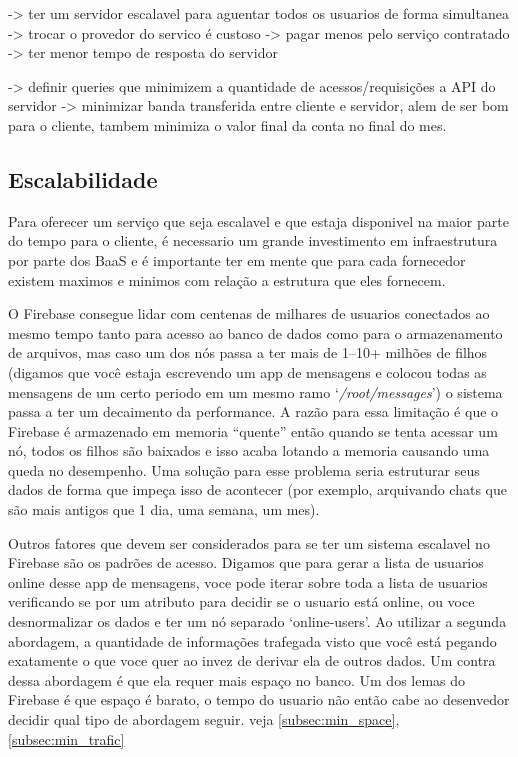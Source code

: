 	-> ter um servidor escalavel para aguentar todos os usuarios de forma simultanea
	-> trocar o provedor do servico é custoso
	-> pagar menos pelo serviço contratado
 	-> ter menor tempo de resposta do servidor

	-> definir queries que minimizem a quantidade de acessos/requisições a API do servidor
	-> minimizar banda transferida entre cliente e servidor, alem de ser bom para o cliente, tambem minimiza o valor final da conta no final do mes.


	\subsection{Escalabilidade}%
	\label{subsec:scalability}
	Para oferecer um serviço que seja escalavel e que estaja disponivel na maior parte do tempo para o cliente, é necessario um grande investimento em infraestrutura por parte dos BaaS e é importante ter em mente que para cada fornecedor existem maximos e minimos com relação a estrutura que eles fornecem. 

	O Firebase consegue lidar com centenas de milhares de usuarios conectados ao mesmo tempo tanto para acesso ao banco de dados como para o armazenamento de arquivos, mas caso um dos nós passa a ter mais de 1--10+ milhões de filhos (digamos que você estaja escrevendo um app de mensagens e colocou todas as mensagens de um certo periodo em um mesmo ramo `\textit{/root/messages}') o sistema passa a ter um decaimento da performance. A razão para essa limitação é que o Firebase é armazenado em memoria ``quente'' então quando se tenta acessar um nó, todos os filhos são baixados e isso acaba lotando a memoria causando uma queda no desempenho. Uma solução para esse problema seria estruturar seus dados de forma que impeça isso de acontecer (por exemplo, arquivando chats que são mais antigos que 1 dia, uma semana, um mes). 	

	Outros fatores que devem ser considerados para se ter um sistema escalavel no Firebase são os padrões de acesso. Digamos que para gerar a lista de usuarios online desse app de mensagens, voce pode iterar sobre toda a lista de usuarios verificando se por um atributo para decidir se o usuario está online, ou voce desnormalizar os dados e ter um nó separado `online-users'. Ao utilizar a segunda abordagem, a quantidade de informações trafegada visto que você está pegando exatamente o que voce quer ao invez de derivar ela de outros dados. Um contra dessa abordagem é que ela requer mais espaço no banco. Um dos lemas do Firebase é que espaço é barato, o tempo do usuario não então cabe ao desenvedor decidir qual tipo de abordagem seguir. veja \ref{subsec:min_space}, \ref{subsec:min_trafic}
	
